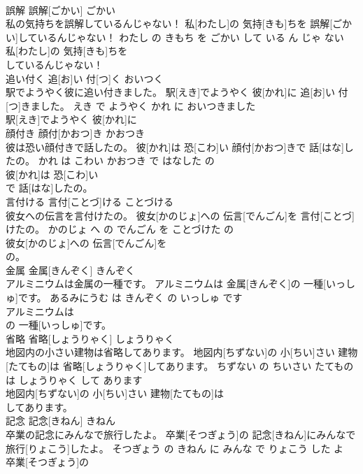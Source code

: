 \documentclass[8pt]{extreport}
\begin{document}
\begin{CJK}{UTF8}{min}
\\	誤解	誤解[ごかい]	ごかい	
\\	私の気持ちを誤解しているんじゃない！	私[わたし]の 気持[きも]ちを 誤解[ごかい]しているんじゃない！	わたし の きもち を ごかい して いる ん じゃ ない	
\\	私[わたし]の 気持[きも]ちを
\\	しているんじゃない！			
\\	追い付く	追[お]い 付[つ]く	おいつく	
\\	駅でようやく彼に追い付きました。	駅[えき]でようやく 彼[かれ]に 追[お]い 付[つ]きました。	えき で ようやく かれ に おいつきました	
\\	駅[えき]でようやく 彼[かれ]に
\\	顔付き	顔付[かおつ]き	かおつき	
\\	彼は恐い顔付きで話したの。	彼[かれ]は 恐[こわ]い 顔付[かおつ]きで 話[はな]したの。	かれ は こわい かおつき で はなした の	
\\	彼[かれ]は 恐[こわ]い
\\	で 話[はな]したの。			
\\	言付ける	言付[ことづ]ける	ことづける	
\\	彼女への伝言を言付けたの。	彼女[かのじょ]への 伝言[でんごん]を 言付[ことづ]けたの。	かのじょ へ の でんごん を ことづけた の	
\\	彼女[かのじょ]への 伝言[でんごん]を
\\	の。			
\\	金属	金属[きんぞく]	きんぞく	
\\	アルミニウムは金属の一種です。	アルミニウムは 金属[きんぞく]の 一種[いっしゅ]です。	あるみにうむ は きんぞく の いっしゅ です	
\\	アルミニウムは
\\	の 一種[いっしゅ]です。			
\\	省略	省略[しょうりゃく]	しょうりゃく	
\\	地図内の小さい建物は省略してあります。	地図内[ちずない]の 小[ちい]さい 建物[たてもの]は 省略[しょうりゃく]してあります。	ちずない の ちいさい たてもの は しょうりゃく して あります	
\\	地図内[ちずない]の 小[ちい]さい 建物[たてもの]は
\\	してあります。			
\\	記念	記念[きねん]	きねん	
\\	卒業の記念にみんなで旅行したよ。	卒業[そつぎょう]の 記念[きねん]にみんなで 旅行[りょこう]したよ。	そつぎょう の きねん に みんな で りょこう した よ	
\\	卒業[そつぎょう]の

\end{CJK}
\end{document}
